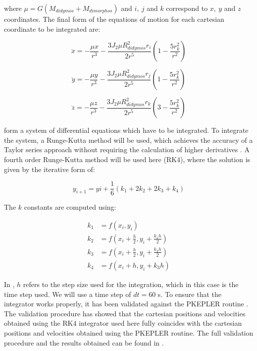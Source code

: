 where $\mu= G\left(M_{didymos} + M_{dimorphos} \right)$ and $i,\ j$ and $k$ correspond to $x,\ y$ and $z$ coordinates. The final form of the equations of motion for each cartesian coordinate to be integrated are:

\begin{equation}
	\label{eq:motionx}
	\ddot{x} = -\frac{\mu x}{r^{3}} -\frac{3 J_{2} \mu R_{didymos}^{2} r_{i}}{2 r^{5}}\left(1-\frac{5 r_{k}^{2}}{r^{2}}\right)
\end{equation}

\begin{equation}
	\label{eq:motiony}
	\ddot{y} = -\frac{\mu y}{r^{3}} -\frac{3 J_{2} \mu R_{didymos}^{2} r_{j}}{2 r^{5}}\left(1-\frac{5 r_{k}^{2}}{r^{2}}\right)
\end{equation}

\begin{equation}
	\label{eq:motionz}
	\ddot{z} = -\frac{\mu z}{r^{3}} -\frac{3 J_{2} \mu R_{didymos}^{2} r_{k}}{2 r^{5}}\left(3-\frac{5 r_{k}^{2}}{r^{2}}\right)
\end{equation}

 form a system of differential equations which have to be integrated. To integrate the system, a Runge-Kutta method will be used, which achieves the accuracy of a Taylor series approach without requiring the calculation of higher derivatives \cite{chapra}. A fourth order Runge-Kutta method will be used here (RK4), where the solution is given by the iterative form of:

\begin{equation}
	y_{i+1}=y{i}+\frac{1}{6}\left( k_{1} + 2k_{2} + 2k_{3} + k_{4}\right)
\end{equation}

The $k$ constants are computed using:

\begin{equation}
\label{eq:rk4-constants}
\begin{aligned}
		k_{1} &= f(x_{i},y_{i})\\
		k_{2} &= f(x_{i}+\frac{h}{2},y_{i}+\frac{k_{1}h}{2})\\
		k_{3} &= f\left( x_{i}+\frac{h}{2},y_{i}+\frac{k_{2}h}{2} \right)\\
		k_{4} &= f(x_{i}+h,y_{i}+k_{3}h)
\end{aligned}
\end{equation}

In , $h$ refers to the step size used for the integration, which in this case is the time step used. We will use a time step of $dt=60$ \si{\second}. To ensure that the integrator works properly, it has been validated against the PKEPLER routine \cite{vallado}. The validation procedure has showed that the cartesian positions and velocities obtained using the RK4 integrator used here fully coincides with the cartesian positions and velocities obtained using the PKEPLER routine. The full validation procedure and the results obtained can be found in .

